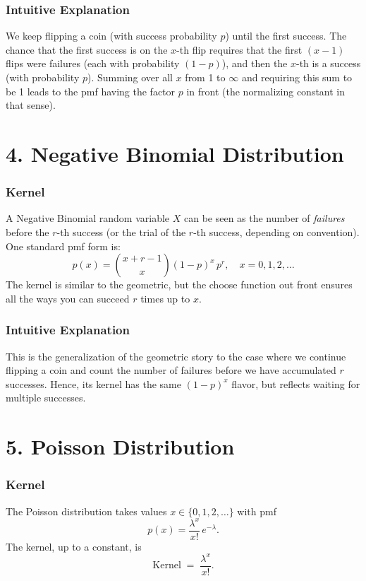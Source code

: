 \documentclass{article}
\begin{document}
\subsubsection*{Intuitive Explanation}
We keep flipping a coin (with success probability \(p\)) until the first success. 
The chance that the first success is on the \(x\)-th flip requires that the first \((x-1)\) flips were failures (each with probability \((1-p)\)), and then the \(x\)-th is a success (with probability \(p\)).
Summing over all \(x\) from 1 to \(\infty\) and requiring this sum to be 1 leads to the pmf having the factor \(p\) in front (the normalizing constant in that sense).

\section*{4. Negative Binomial Distribution}

\subsubsection*{Kernel}
A Negative Binomial random variable \(X\) can be seen as the number of \emph{failures} before the \(r\)-th success (or the trial of the \(r\)-th success, depending on convention). 
One standard pmf form is:
\[
p(x) = \binom{x + r - 1}{x} (1-p)^x\, p^r, 
\quad x = 0,1,2,\ldots
\]
The kernel is similar to the geometric, but the choose function out front ensures all the ways you can succeed $r$ times up to $x$.

\subsubsection*{Intuitive Explanation}
This is the generalization of the geometric story to the case where we continue flipping a coin and count the number of failures before we have accumulated \(r\) successes. 
Hence, its kernel has the same \((1-p)^{x}\) flavor, but reflects waiting for multiple successes.

\section*{5. Poisson Distribution}

\subsubsection*{Kernel}
The Poisson distribution takes values \(x \in \{0,1,2,\ldots\}\) with pmf
\[
p(x) = \frac{\lambda^x}{x!}\, e^{-\lambda}.
\]
The kernel, up to a constant, is
\[
\text{Kernel} \;=\; \frac{\lambda^x}{x!}.
\]
\end{document}
